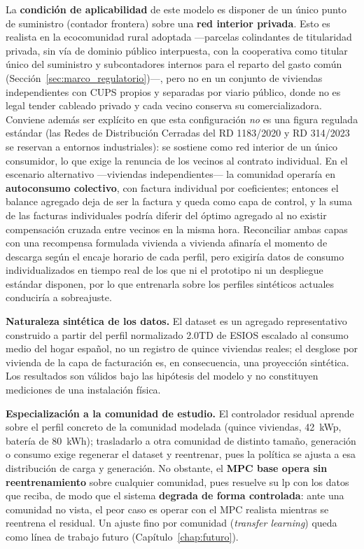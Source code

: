 \documentclass[12pt, a4paper, twoside]{report}
\begin{document}
La \textbf{condición de aplicabilidad} de este modelo es disponer de un único
punto de suministro (contador frontera) sobre una \textbf{red interior privada}.
Esto es realista en la ecocomunidad rural adoptada —parcelas colindantes de
titularidad privada, sin vía de dominio público interpuesta, con la cooperativa
como titular único del suministro y subcontadores internos para el reparto del
gasto común (Sección~\ref{sec:marco_regulatorio})—, pero no en un conjunto de
viviendas independientes con CUPS propios y separadas por viario público, donde
no es legal tender cableado privado y cada vecino conserva su comercializadora.
Conviene además ser explícito en que esta configuración \emph{no} es una figura
regulada estándar (las Redes de Distribución Cerradas del RD 1183/2020 y RD
314/2023 se reservan a entornos industriales): se sostiene como red interior de un
único consumidor, lo que exige la renuncia de los vecinos al contrato individual.
En el escenario alternativo —viviendas independientes— la comunidad operaría en
\textbf{autoconsumo colectivo}, con factura individual por coeficientes; entonces
el balance agregado deja de ser la factura y queda como capa de control, y la suma
de las facturas individuales podría diferir del óptimo agregado al no existir
compensación cruzada entre vecinos en la misma hora.
Reconciliar ambas capas con una recompensa formulada vivienda a vivienda afinaría
el momento de descarga según el encaje horario de cada perfil, pero exigiría
datos de consumo individualizados en tiempo real de los que ni el prototipo ni un
despliegue estándar disponen, por lo que entrenarla sobre los perfiles sintéticos
actuales conduciría a sobreajuste.

\textbf{Naturaleza sintética de los datos.} El dataset es un agregado
representativo construido a partir del perfil normalizado 2.0TD de ESIOS escalado
al consumo medio del hogar español, no un registro de quince viviendas reales; el
desglose por vivienda de la capa de facturación es, en consecuencia, una
proyección sintética. Los resultados son válidos bajo las hipótesis del modelo y
no constituyen mediciones de una instalación física.

\textbf{Especialización a la comunidad de estudio.} El controlador residual aprende
sobre el perfil concreto de la comunidad modelada (quince viviendas, \SI{42}{kWp},
batería de \SI{80}{kWh}); trasladarlo a otra comunidad de distinto tamaño,
generación o consumo exige regenerar el dataset y reentrenar, pues la política se
ajusta a esa distribución de carga y generación. No obstante, el \textbf{MPC base
opera sin reentrenamiento} sobre cualquier comunidad, pues resuelve su \acrshort{lp}
con los datos que reciba, de modo que el sistema \textbf{degrada de forma controlada}:
ante una comunidad no vista, el peor caso es operar con el MPC realista mientras se
reentrena el residual. Un ajuste fino por comunidad (\textit{transfer learning})
queda como línea de trabajo futuro (Capítulo~\ref{chap:futuro}).
\end{document}
